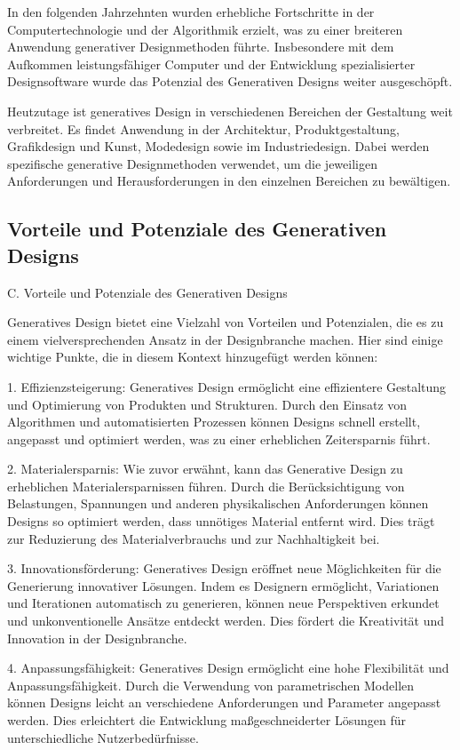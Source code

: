 In den folgenden Jahrzehnten wurden erhebliche Fortschritte in der Computertechnologie und der Algorithmik erzielt, was zu einer breiteren Anwendung generativer Designmethoden führte. Insbesondere mit dem Aufkommen leistungsfähiger Computer und der Entwicklung spezialisierter Designsoftware wurde das Potenzial des Generativen Designs weiter ausgeschöpft.

Heutzutage ist generatives Design in verschiedenen Bereichen der Gestaltung weit verbreitet. Es findet Anwendung in der Architektur, Produktgestaltung, Grafikdesign und Kunst, Modedesign sowie im Industriedesign. Dabei werden spezifische generative Designmethoden verwendet, um die jeweiligen Anforderungen und Herausforderungen in den einzelnen Bereichen zu bewältigen.

\subsection*{Vorteile und Potenziale des Generativen Designs}

C. Vorteile und Potenziale des Generativen Designs

Generatives Design bietet eine Vielzahl von Vorteilen und Potenzialen, die es zu einem vielversprechenden Ansatz in der Designbranche machen. Hier sind einige wichtige Punkte, die in diesem Kontext hinzugefügt werden können:

1. Effizienzsteigerung: Generatives Design ermöglicht eine effizientere Gestaltung und Optimierung von Produkten und Strukturen. Durch den Einsatz von Algorithmen und automatisierten Prozessen können Designs schnell erstellt, angepasst und optimiert werden, was zu einer erheblichen Zeitersparnis führt.

2. Materialersparnis: Wie zuvor erwähnt, kann das Generative Design zu erheblichen Materialersparnissen führen. Durch die Berücksichtigung von Belastungen, Spannungen und anderen physikalischen Anforderungen können Designs so optimiert werden, dass unnötiges Material entfernt wird. Dies trägt zur Reduzierung des Materialverbrauchs und zur Nachhaltigkeit bei.

3. Innovationsförderung: Generatives Design eröffnet neue Möglichkeiten für die Generierung innovativer Lösungen. Indem es Designern ermöglicht, Variationen und Iterationen automatisch zu generieren, können neue Perspektiven erkundet und unkonventionelle Ansätze entdeckt werden. Dies fördert die Kreativität und Innovation in der Designbranche.

4. Anpassungsfähigkeit: Generatives Design ermöglicht eine hohe Flexibilität und Anpassungsfähigkeit. Durch die Verwendung von parametrischen Modellen können Designs leicht an verschiedene Anforderungen und Parameter angepasst werden. Dies erleichtert die Entwicklung maßgeschneiderter Lösungen für unterschiedliche Nutzerbedürfnisse.

